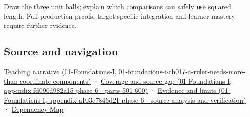 Draw the three unit balls; explain which comparisons can safely use squared length. Full production proofs, target-specific integration and learner mastery require further evidence.

\subsection{Source and navigation}\label{appendix-49933872bb51-source-and-navigation}

\href{../01-Foundations-I/main.pdf\#nameddest=01-foundations-i-ch017-a-ruler-needs-more-than-coordinate-components}{Teaching narrative (01-Foundations-I, 01-foundations-i-ch017-a-ruler-needs-more-than-coordinate-components)} · \href{../01-Foundations-I/main.pdf\#nameddest=appendix-fd090d982a15-phase-6---parts-501-600}{Coverage and source gap (01-Foundations-I, appendix-fd090d982a15-phase-6-\/-\/-parts-501-600)} · \href{../01-Foundations-I/main.pdf\#nameddest=appendix-a103e7846d21-phase-6---source-analysis-and-verification}{Evidence and limits (01-Foundations-I, appendix-a103e7846d21-phase-6-\/-\/-source-analysis-and-verification)} · \hyperref[appendix-4ad47bdd269a]{Dependency Map}
